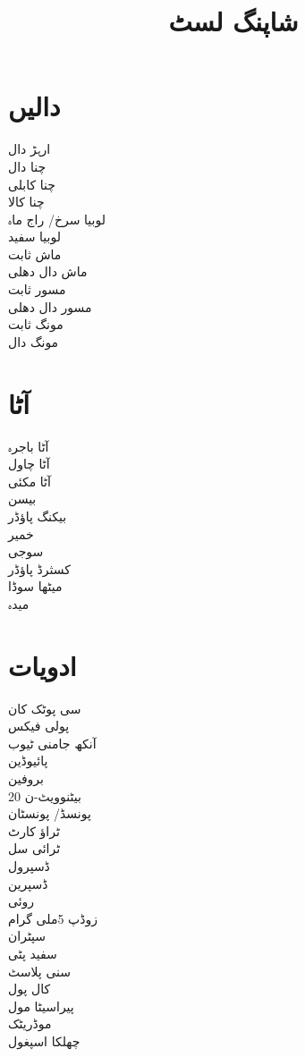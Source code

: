 \documentclass[a4paper,11pt]{article}
\title{ \vspace{-3cm} شاپنگ لسٹ}
\date{}
\begin{document}
 
\maketitle
 \vspace{-2cm}
 \begin{multicols}{6}
\section*{دالیں}
ارہڑ دال \\
چنا دال \\
چنا کابلی \\
چنا کالا \\
لوبیا سرخ/ راج ماہ \\
لوبیا سفید \\
ماش ثابت \\
ماش دال دھلی \\
مسور ثابت \\
مسور دال دھلی \\
مونگ ثابت \\
مونگ دال
\section*{آٹا}
آٹا باجرہ \\
آٹا چاول \\
آٹا مکئی \\
بیسن \\
بیکنگ پاؤڈر \\
خمیر \\
سوجی \\
کسثرڈ پاؤڈر \\
میٹھا سوڈا \\
میدہ
\section*{ادویات}
سی پوٹک کان \\
پولی فیکس  \\
آنکھ جامنی ٹیوب  \\
پائیوڈین \\
بروفین \\
بیٹنوویٹ-ن 20 \\
پونسڈ/ پونسٹان \\
ٹراؤ کارٹ \\
ٹرائی سل \\
ڈسپرول \\
ڈسپرین \\
روئی \\
زوڈپ 5ملی گرام \\
سپٹران \\
سفید پٹی \\
سنی پلاسٹ \\
کال پول \\
پیراسیٹا مول \\
موڈریٹک \\
چھلکا اسپغول

\end{multicols}
\end{document}

